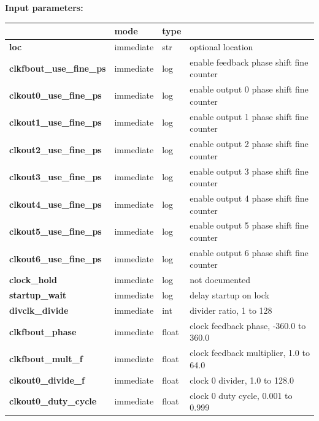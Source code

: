             {\bf Input parameters:} \\            
            \begin{tabular}{| l | l | l | l |}
            \hline
                                          & mode  & type   & \\
            \hline \hline
            {\bf loc}                     & immediate & str   & optional location \\ \hline
            {\bf clkfbout\_use\_fine\_ps} & immediate & log   & enable feedback phase shift fine counter \\ \hline
            {\bf clkout0\_use\_fine\_ps}  & immediate & log   & enable output 0 phase shift fine counter  \\ \hline
            {\bf clkout1\_use\_fine\_ps}  & immediate & log   & enable output 1 phase shift fine counter  \\ \hline
            {\bf clkout2\_use\_fine\_ps}  & immediate & log   & enable output 2 phase shift fine counter  \\ \hline
            {\bf clkout3\_use\_fine\_ps}  & immediate & log   & enable output 3 phase shift fine counter  \\ \hline
            {\bf clkout4\_use\_fine\_ps}  & immediate & log   & enable output 4 phase shift fine counter  \\ \hline
            {\bf clkout5\_use\_fine\_ps}  & immediate & log   & enable output 5 phase shift fine counter  \\ \hline
            {\bf clkout6\_use\_fine\_ps}  & immediate & log   & enable output 6 phase shift fine counter  \\ \hline
            {\bf clock\_hold}             & immediate & log   & not documented \\ \hline
            {\bf startup\_wait}           & immediate & log   & delay startup on lock \\ \hline
            {\bf divclk\_divide}          & immediate & int   & divider ratio, 1 to 128 \\ \hline
            {\bf clkfbout\_phase}         & immediate & float & clock feedback phase, -360.0 to 360.0\\ \hline
            {\bf clkfbout\_mult\_f}       & immediate & float & clock feedback multiplier, 1.0 to 64.0\\ \hline
            {\bf clkout0\_divide\_f}      & immediate & float & clock 0 divider, 1.0 to 128.0\\ \hline
            {\bf clkout0\_duty\_cycle}    & immediate & float & clock 0 duty cycle, 0.001 to 0.999\\ \hline

\end{tabular}
